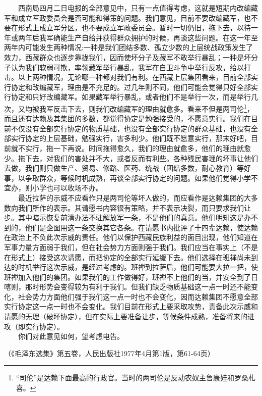 \documentclass[cn,11pt,chinese]{elegantbook}
\begin{document}
　　西南局四月二日电报的全部意见中，只有一点值得考虑，这就是短期内改编藏军和成立军政委员会是否可能和得策的问题。我们意见，目前不要改编藏军，也不要在形式上成立军分区，也不要成立军政委员会。暂时一切仍旧，拖下去，以待一年或两年后我军确能生产自给并获得群众拥护的时候，再谈这些问题。在这一年至两年内可能发生两种情况:一种是我们团结多数、孤立少数的上层统战政策发生了效力，西藏群众也逐步靠拢我们，因而使坏分子及藏军不敢举行暴乱；一种是坏分子认为我们软弱可欺，率领藏军举行暴乱，我军在自卫斗争中举行反攻，给以打击。以上两种情况，无论哪一种都对我们有利。在西藏上层集团看来，目前全部实行协定和改编藏军，理由是不充足的。过几年则不同，他们可能会觉得只好全部实行协定和只好改编藏军。如果藏军举行暴乱，或者他们不是举行一次，而是举行几次，又均被我军反击下去，则我们改编藏军的理由就愈多。看来不但是两司伦\footnote[1]{“司伦”是达赖下面最高的行政官。当时的两司伦是反动农奴主鲁康娃和罗桑札喜。}，而且还有达赖及其集团的多数，都觉得协定是勉强接受的，不愿意实行。我们在目前不仅没有全部实行协定的物质基础，也没有全部实行协定的群众基础，也没有全部实行协定的上层基础，勉强实行，害多利少。他们既不愿意实行，那末好吧，目前就不实行，拖一下再说。时间拖得愈久，我们的理由就愈多，他们的理由就愈少。拖下去，对我们的害处并不大，或者反而有利些。各种残民害理的坏事让他们去做，我们则只做生产、贸易、修路、医药、统战（团结多数，耐心教育）等好事，以争取群众，等候时机成熟，再谈全部实行协定的问题。如果他们觉得小学不宜办，则小学也可以收场不办。\\
　　最近拉萨的示威不应看作只是两司伦等坏人做的，而应看作是达赖集团的大多数向我们所作的表示。其请愿书内容很有策略，并不表示决裂，而只要求我们让步。其中暗示恢复前清办法不驻解放军一条，不是他们的真意。他们明知这是办不到的，他们是企图用这一条交换其它各条。在请愿书内批评了十四辈达赖，使达赖在政治上不负此次示威的责任。他们以保护西藏民族利益的面目出现，他们知道在军事力量方面弱于我们，但在社会势力方面则强于我们。我们应当在事实上（不是在形式上）接受这次请愿，而把协定的全部实行延缓下去。他们选择在班禅尚未到达的时机举行这次示威，是经过考虑的。班禅到拉萨后，他们可能要大拉一把，使班禅加入他们的集团。如果我们的工作做得好，班禅不上他们的当，并安全到了日喀则，那时形势会变得较为有利于我们。但我们缺乏物质基础这一点一时还不能变化，社会势力方面他们强于我们这一点一时也不会变化，因而达赖集团不愿意全部实行协定这一点一时也不会变化。我们目前在形式上要采取攻势，责备此次示威和请愿的无理（破坏协定），但在实际上要准备让步，等候条件成熟，准备将来的进攻（即实行协定）。\\
　　你们对此意见如何，望考虑电告。\\
\begin{flushright}（《毛泽东选集》第五卷，人民出版社1977年4月第1版，第61-64页）\end{flushright}
\end{document}
